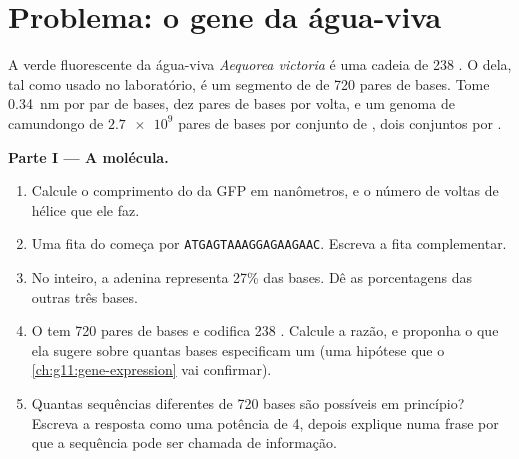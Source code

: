 \section{Problema: o gene da água-viva}

\begin{problem}
\label{pb:g10:universal-dna:1}
A  verde fluorescente da água-viva \emph{Aequorea victoria} é
uma cadeia de 238 . O  dela, tal como usado no
laboratório, é um segmento de  de 720 pares de bases. Tome
\qty{0.34}{nm} por par de bases, dez pares de bases por volta, e um
genoma de camundongo de $\num{2.7e9}$ pares de bases por conjunto de
, dois conjuntos por .

\medskip
\noindent\textbf{Parte I --- A molécula.}
\begin{enumerate}
  \item Calcule o comprimento do  da GFP em nanômetros, e o número
        de voltas de hélice que ele faz.
  \item Uma fita do  começa por \texttt{ATGAGTAAAGGAGAAGAAC}.
        Escreva a fita complementar.
  \item No  inteiro, a adenina representa 27\% das bases. Dê as
        porcentagens das outras três bases.
  \item O  tem 720 pares de bases e codifica 238 .
        Calcule a razão, e proponha o que ela sugere sobre quantas
        bases especificam um  (uma hipótese que o
        \cref{ch:g11:gene-expression} vai confirmar).
  \item Quantas sequências diferentes de 720 bases são possíveis em
        princípio? Escreva a resposta como uma potência de 4, depois
        explique numa frase por que a sequência pode ser chamada de
        informação.
\end{enumerate}


\end{problem}

